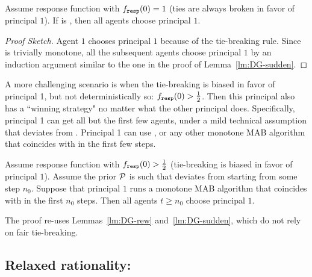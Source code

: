 \begin{theorem}\label{thm:HardMax-hardTies}
Assume \HardMax response function with $f_{\mathtt{resp}}(0)=1$ (ties are always broken in favor of principal $1$). If \alg[1] is \StaticGreedy, then all agents choose principal $1$.
\end{theorem}

\begin{proof}[Proof Sketch]
Agent $1$ chooses principal $1$ because of the tie-breaking rule. Since \StaticGreedy is trivially monotone, all the subsequent agents choose principal $1$ by an induction argument similar to the one in the proof of Lemma~\ref{lm:DG-sudden}.
\end{proof}



A more challenging scenario is when the tie-breaking is biased in favor of principal 1, but not deterministically so: $f_{\mathtt{resp}}(0)>\tfrac12$. Then this principal also has a ``winning strategy" no matter what the other principal does. Specifically, principal 1 can get all but the first few agents, under a mild technical assumption that \DynGreedy deviates from \StaticGreedy. Principal 1 can use \DynGreedy, or any other monotone MAB algorithm that coincides with \DynGreedy in the first few steps.



\begin{theorem}\label{thm:HardMax-biased}
Assume \HardMax response function with $f_{\mathtt{resp}}(0)>\tfrac12$ (\ie tie-breaking is biased in favor of principal $1$). Assume the prior $\mathcal{P}$ is such that \DynGreedy deviates from \StaticGreedy starting from some step $n_0$. Suppose that principal $1$ runs a monotone MAB algorithm that coincides with \DynGreedy in the first $n_0$ steps. Then all agents $t\geq n_0$ choose principal $1$.
\end{theorem}

The proof re-uses Lemmas~\ref{lm:DG-rew} and~\ref{lm:DG-sudden}, which do not rely on fair tie-breaking.



\subsection{Relaxed rationality: \HardMaxRandom}
\label{sec:theory-HMR}

